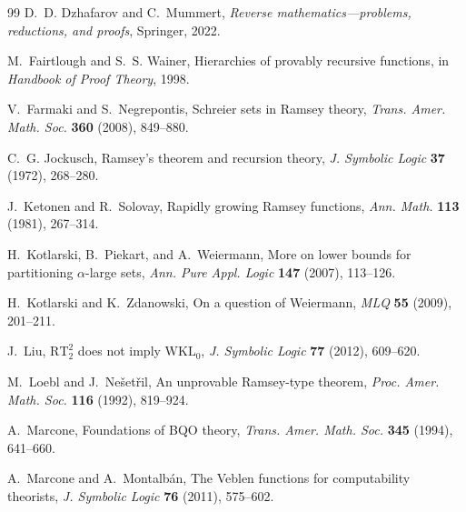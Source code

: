 \documentclass[11pt]{amsart}
\theoremstyle{definition}
\theoremstyle{remark}
\theoremstyle{plain}
\begin{document}
\begin{thebibliography}{99}
D.~D. Dzhafarov and C.~Mummert,
\newblock \emph{Reverse mathematics---problems, reductions, and proofs},
\newblock Springer, 2022.


M.~Fairtlough and S.~S. Wainer,
\newblock Hierarchies of provably recursive functions,
\newblock in \emph{Handbook of Proof Theory}, 1998.

V.~Farmaki and S.~Negrepontis,
\newblock Schreier sets in Ramsey theory,
\newblock \emph{Trans. Amer. Math. Soc.} \textbf{360} (2008), 849--880.


C.~G. Jockusch,
\newblock Ramsey's theorem and recursion theory,
\newblock \emph{J. Symbolic Logic} \textbf{37} (1972), 268--280.

J.~Ketonen and R.~Solovay,
\newblock Rapidly growing Ramsey functions,
\newblock \emph{Ann. Math.} \textbf{113} (1981), 267--314.

H.~Kotlarski, B.~Piekart, and A.~Weiermann,
\newblock More on lower bounds for partitioning $\alpha$-large sets,
\newblock \emph{Ann. Pure Appl. Logic} \textbf{147} (2007), 113--126.

H.~Kotlarski and K.~Zdanowski,
\newblock On a question of Weiermann,
\newblock \emph{MLQ} \textbf{55} (2009), 201--211.

J.~Liu,
\newblock $\mathrm{RT}^2_2$ does not imply $\mathrm{WKL}_0$,
\newblock \emph{J. Symbolic Logic} \textbf{77} (2012), 609--620.

M.~Loebl and J.~Ne{\v{s}}et{\v{r}}il,
\newblock An unprovable Ramsey-type theorem,
\newblock \emph{Proc. Amer. Math. Soc.} \textbf{116} (1992), 819--924.

A.~Marcone,
\newblock Foundations of BQO theory,
\newblock \emph{Trans. Amer. Math. Soc.} \textbf{345} (1994), 641--660.

A.~Marcone and A.~Montalb\'an,
\newblock The Veblen functions for computability theorists,
\newblock \emph{J. Symbolic Logic} \textbf{76} (2011), 575--602.


\end{thebibliography}
\end{document}

